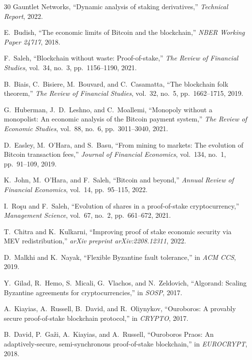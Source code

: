 \documentclass[11pt,a4paper]{article}
\begin{document}
\begin{thebibliography}{30}
Gauntlet Networks, ``Dynamic analysis of staking derivatives,'' \emph{Technical Report}, 2022.

E.~Budish, ``The economic limits of Bitcoin and the blockchain,'' \emph{NBER Working Paper 24717}, 2018.

F.~Saleh, ``Blockchain without waste: Proof-of-stake,'' \emph{The Review of Financial Studies}, vol.~34, no.~3, pp.~1156--1190, 2021.

B.~Biais, C.~Bisiere, M.~Bouvard, and C.~Casamatta, ``The blockchain folk theorem,'' \emph{The Review of Financial Studies}, vol.~32, no.~5, pp.~1662--1715, 2019.

G.~Huberman, J.~D.~Leshno, and C.~Moallemi, ``Monopoly without a monopolist: An economic analysis of the Bitcoin payment system,'' \emph{The Review of Economic Studies}, vol.~88, no.~6, pp.~3011--3040, 2021.

D.~Easley, M.~O'Hara, and S.~Basu, ``From mining to markets: The evolution of Bitcoin transaction fees,'' \emph{Journal of Financial Economics}, vol.~134, no.~1, pp.~91--109, 2019.

K.~John, M.~O'Hara, and F.~Saleh, ``Bitcoin and beyond,'' \emph{Annual Review of Financial Economics}, vol.~14, pp.~95--115, 2022.

I.~Ro\c{s}u and F.~Saleh, ``Evolution of shares in a proof-of-stake cryptocurrency,'' \emph{Management Science}, vol.~67, no.~2, pp.~661--672, 2021.

T.~Chitra and K.~Kulkarni, ``Improving proof of stake economic security via MEV redistribution,'' \emph{arXiv preprint arXiv:2208.12311}, 2022.

D.~Malkhi and K.~Nayak, ``Flexible Byzantine fault tolerance,'' in \emph{ACM CCS}, 2019.

Y.~Gilad, R.~Hemo, S.~Micali, G.~Vlachos, and N.~Zeldovich, ``Algorand: Scaling Byzantine agreements for cryptocurrencies,'' in \emph{SOSP}, 2017.

A.~Kiayias, A.~Russell, B.~David, and R.~Oliynykov, ``Ouroboros: A provably secure proof-of-stake blockchain protocol,'' in \emph{CRYPTO}, 2017.

B.~David, P.~Ga\v{z}i, A.~Kiayias, and A.~Russell, ``Ouroboros Praos: An adaptively-secure, semi-synchronous proof-of-stake blockchain,'' in \emph{EUROCRYPT}, 2018.

\end{thebibliography}
\end{document}
